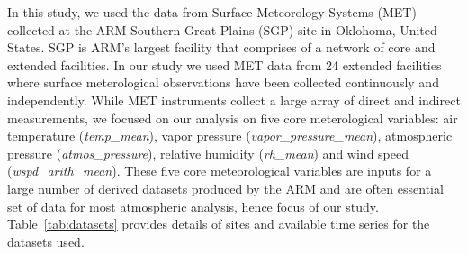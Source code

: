 In this study, we used the data from Surface Meteorology Systems (MET)
collected at the ARM Southern Great Plains (SGP) site in
Oklohoma, United States. SGP is ARM's largest facility that
comprises of a network of core and extended facilities. In our study we
used MET data from 24 extended facilities where surface meterological
observations have been collected continuously and independently. 
While MET instruments collect a large array of direct and indirect
measurements, we focused on our analysis on five core meterological variables:
air temperature (\textit{temp\_mean}), vapor pressure
(\textit{vapor\_pressure\_mean}),
atmospheric pressure (\textit{atmos\_pressure}), relative humidity
(\textit{rh\_mean}) and wind speed
(\textit{wspd\_arith\_mean}). These five core meteorological variables are
inputs for a large number of derived datasets produced by the ARM and
are often essential set of data for most atmospheric analysis, hence
focus of our study. Table~\ref{tab:datasets} provides details of sites
and available time series for the datasets used.



